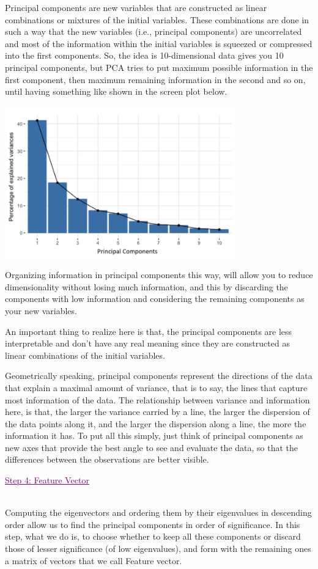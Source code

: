 Principal components are new variables that are constructed as linear combinations or mixtures of the initial variables. These combinations are done in such a way that the new variables (i.e., principal components) are uncorrelated and most of the information within the initial variables is squeezed or compressed into the first components. So, the idea is 10-dimensional data gives you 10 principal components, but PCA tries to put maximum possible information in the first component, then maximum remaining information in the second and so on, until having something like shown in the screen plot below.
\centerline{\includegraphics[width=100mm,scale=1]{Images/A5_img1.PNG}}
Organizing information in principal components this way, will allow you to reduce dimensionality without losing much information, and this by discarding the components with low information and considering the remaining components as your new variables.

An important thing to realize here is that, the principal components are less interpretable and don’t have any real meaning since they are constructed as linear combinations of the initial variables.

Geometrically speaking, principal components represent the directions of the data that explain a maximal amount of variance, that is to say, the lines that capture most information of the data. The relationship between variance and information here, is that, the larger the variance carried by a line, the larger the dispersion of the data points along it, and the larger the dispersion along a line, the more the information it has. To put all this simply, just think of principal components as new axes that provide the best angle to see and evaluate the data, so that the differences between the observations are better visible. \\[0.2 cm]
\textcolor{purple}{\centerline{\underline{{ Step 4: Feature Vector }}}}\\[0.2 cm]
Computing the eigenvectors and ordering them by their eigenvalues in descending order allow us to find the principal components in order of significance. In this step, what we do is, to choose whether to keep all these components or discard those of lesser significance (of low eigenvalues), and form with the remaining ones a matrix of vectors that we call Feature vector.

